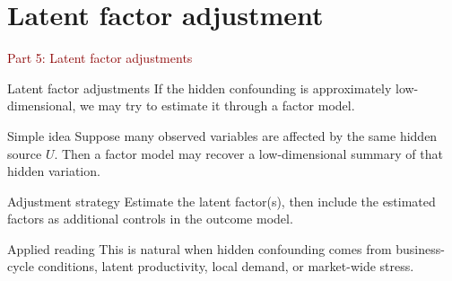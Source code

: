 \documentclass[dvipsnames,aspectratio=169,handout]{beamer}
\begin{document}

\section{Latent factor adjustment}

\begin{frame}{}
\begin{center}
{\Huge \textcolor{DarkRed}{Part 5: Latent factor adjustments}}
\end{center}
\end{frame}

\begin{frame}{Latent factor adjustments}
If the hidden confounding is approximately low-dimensional, we may try to estimate it through a factor model.

\begin{block}{Simple idea}
Suppose many observed variables are affected by the same hidden source $U$.
Then a factor model may recover a low-dimensional summary of that hidden variation.
\end{block}

\begin{alertblock}{Adjustment strategy}
Estimate the latent factor(s), then include the estimated factors as additional controls in the outcome model.
\end{alertblock}

\begin{block}{Applied reading}
This is natural when hidden confounding comes from business-cycle conditions, latent productivity, local demand, or market-wide stress.
\end{block}
\end{frame}
\end{document}
